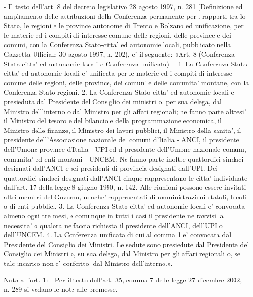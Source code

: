     - Il testo dell'art. 8 del decreto legislativo 28 agosto 1997, n. 281 (Definizione ed ampliamento delle attribuzioni della Conferenza permanente per i rapporti tra lo Stato, le regioni e le province autonome di Trento e Bolzano ed unificazione, per le materie ed i compiti di interesse comune delle regioni, delle province e dei comuni, con la Conferenza Stato-citta' ed autonomie locali, pubblicato nella Gazzetta Ufficiale 30 agosto 1997, n. 202), e' il seguente: «Art. 8 (Conferenza Stato-citta' ed autonomie locali e Conferenza unificata). - 1. La Conferenza Stato-citta' ed autonomie locali e' unificata per le materie ed i compiti di interesse comune delle regioni, delle province, dei comuni e delle comunita' montane, con la Conferenza Stato-regioni. 2. La Conferenza Stato-citta' ed autonomie locali e' presieduta dal Presidente del Consiglio dei ministri o, per sua delega, dal Ministro dell'interno o dal Ministro per gli affari regionali; ne fanno parte altresi' il Ministro del tesoro e del bilancio e della programmazione economica, il Ministro delle finanze, il Ministro dei lavori pubblici, il Ministro della sanita', il presidente dell'Associazione nazionale dei comuni d'Italia - ANCI, il presidente dell'Unione province d'Italia - UPI ed il presidente dell'Unione nazionale comuni, comunita' ed enti montani - UNCEM. Ne fanno parte inoltre quattordici sindaci designati dall'ANCI e sei presidenti di provincia designati dall'UPI. Dei quattordici sindaci designati dall'ANCI cinque rappresentano le citta' individuate dall'art. 17 della legge 8 giugno 1990, n. 142. Alle riunioni possono essere invitati altri membri del Governo, nonche' rappresentati di amministrazioni statali, locali o di enti pubblici. 3. La Conferenza Stato-citta' ed autonomie locali e' convocata almeno ogni tre mesi, e comunque in tutti i casi il presidente ne ravvisi la necessita' o qualora ne faccia richiesta il presidente dell'ANCI, dell'UPI o dell'UNCEM. 4. La Conferenza unificata di cui al comma 1 e' convocata dal Presidente del Consiglio dei Ministri. Le sedute sono presiedute dal Presidente del Consiglio dei Ministri o, su sua delega, dal Ministro per gli affari regionali o, se tale incarico non e' conferito, dal Ministro dell'interno.».

    Nota all'art. 1:
    - Per il testo dell'art. 35, comma 7 delle legge 27 dicembre 2002, n. 289 si vedano le note alle premesse.

